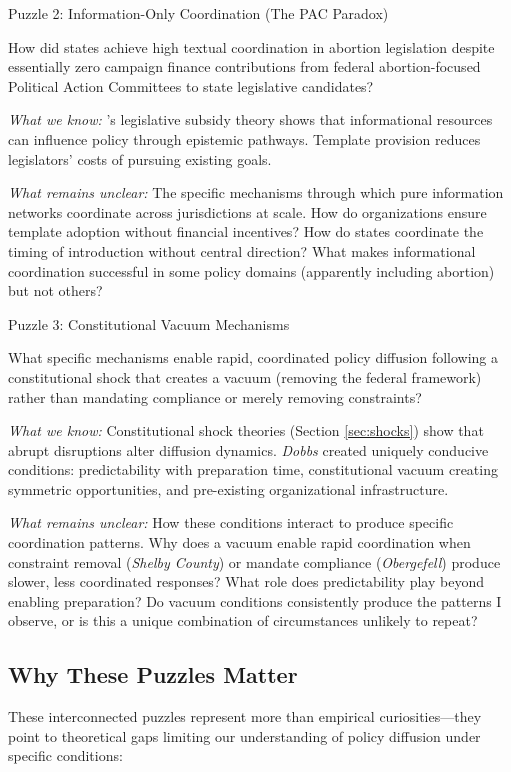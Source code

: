 Puzzle 2: Information-Only Coordination (The PAC Paradox)

How did states achieve high textual coordination in abortion legislation despite essentially zero campaign finance contributions from federal abortion-focused Political Action Committees to state legislative candidates?

\emph{What we know:} \textcite{hallLobbyingLegislativeSubsidy2006a}'s legislative subsidy theory shows that informational resources can influence policy through epistemic pathways. Template provision reduces legislators' costs of pursuing existing goals.

\emph{What remains unclear:} The specific mechanisms through which pure information networks coordinate across jurisdictions at scale. How do organizations ensure template adoption without financial incentives? How do states coordinate the timing of introduction without central direction? What makes informational coordination successful in some policy domains (apparently including abortion) but not others?

Puzzle 3: Constitutional Vacuum Mechanisms

What specific mechanisms enable rapid, coordinated policy diffusion following a constitutional shock that creates a vacuum (removing the federal framework) rather than mandating compliance or merely removing constraints?

\emph{What we know:} Constitutional shock theories (Section \ref{sec:shocks}) show that abrupt disruptions alter diffusion dynamics. \emph{Dobbs} created uniquely conducive conditions: predictability with preparation time, constitutional vacuum creating symmetric opportunities, and pre-existing organizational infrastructure.

\emph{What remains unclear:} How these conditions interact to produce specific coordination patterns. Why does a vacuum enable rapid coordination when constraint removal (\emph{Shelby County}) or mandate compliance (\emph{Obergefell}) produce slower, less coordinated responses? What role does predictability play beyond enabling preparation? Do vacuum conditions consistently produce the patterns I observe, or is this a unique combination of circumstances unlikely to repeat?

\subsection{Why These Puzzles Matter}

These interconnected puzzles represent more than empirical curiosities---they point to theoretical gaps limiting our understanding of policy diffusion under specific conditions:

